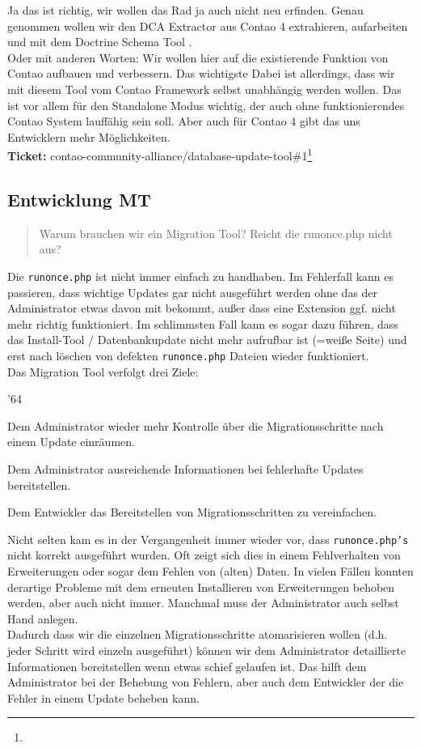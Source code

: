 \documentclass[
paper=a4,
draft=false,%
fontsize=10pt%
]{scrartcl}
\begin{document}
Ja das ist richtig, wir wollen das Rad ja auch nicht neu erfinden. Genau genommen wollen wir den DCA Extractor aus Contao 4 extrahieren, aufarbeiten und mit dem Doctrine Schema Tool .\\
Oder mit anderen Worten: Wir wollen hier auf die existierende Funktion von Contao aufbauen und verbessern. Das wichtigste Dabei ist allerdings, dass wir mit diesem Tool vom Contao Framework selbst unabhängig werden wollen. Das ist vor allem für den Standalone Modus wichtig, der auch ohne funktionierendes Contao System lauffähig sein soll. Aber auch für Contao 4 gibt das uns Entwicklern mehr Möglichkeiten.\\
\textbf{Ticket:} contao-community-alliance/database-update-tool\#1\footnote{}

\subsection{Entwicklung MT}

\begin{quotation}
Warum brauchen wir ein Migration Tool? Reicht die runonce.php nicht aus?
\end{quotation}

Die \texttt{runonce.php} ist nicht immer einfach zu handhaben. Im Fehlerfall kann es passieren, dass wichtige Updates gar nicht ausgeführt werden ohne das der Administrator etwas davon mit bekommt, außer dass eine Extension ggf. nicht mehr richtig funktioniert. Im schlimmsten Fall kann es sogar dazu führen, dass das Install-Tool / Datenbankupdate nicht mehr aufrufbar ist (=weiße Seite) und erst nach löschen von defekten \texttt{runonce.php} Dateien wieder funktioniert.\\
Das Migration Tool verfolgt drei Ziele:

\begin{dinglist}{'64}
\item Dem Administrator wieder mehr Kontrolle über die Migrationsschritte nach einem Update einräumen.
\item Dem Administrator ausreichende Informationen bei fehlerhafte Updates bereitstellen.
\item Dem Entwickler das Bereitstellen von Migrationsschritten zu vereinfachen.
\end{dinglist}

Nicht selten kam es in der Vergangenheit immer wieder vor, dass \texttt{runonce.php's} nicht korrekt ausgeführt wurden. Oft zeigt sich dies in einem Fehlverhalten von Erweiterungen oder sogar dem Fehlen von (alten) Daten. In vielen Fällen konnten derartige Probleme mit dem erneuten Installieren von Erweiterungen behoben werden, aber auch nicht immer. Manchmal muss der Administrator auch selbst Hand anlegen.\\
Dadurch dass wir die einzelnen Migrationsschritte atomarisieren wollen (d.h. jeder Schritt wird einzeln ausgeführt) können wir dem Administrator detaillierte Informationen bereitstellen wenn etwas schief gelaufen ist. Das hilft dem Administrator bei der Behebung von Fehlern, aber auch dem Entwickler der die Fehler in einem Update beheben kann.
\end{document}
